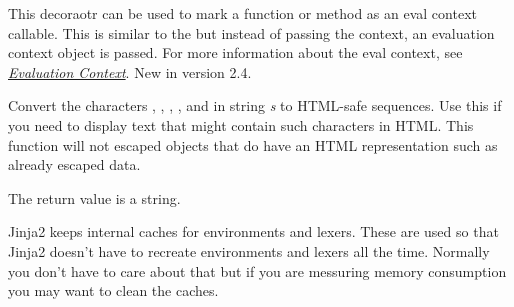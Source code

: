 \documentclass[a4paper,10pt,english]{sphinxmanual}
\begin{document}

\begin{fulllineitems}
\label{api:jinja2.evalcontextfunction}
This decoraotr can be used to mark a function or method as an eval
context callable.  This is similar to the {\hyperref[api:jinja2.contextfunction]{}}
but instead of passing the context, an evaluation context object is
passed.  For more information about the eval context, see
{\hyperref[api:eval-context]{\emph{Evaluation Context}}}.
New in version 2.4.
\end{fulllineitems}


\begin{fulllineitems}
\label{api:jinja2.escape}
Convert the characters \code{\&}, \code{\textless{}}, \code{\textgreater{}}, , and  in string \emph{s}
to HTML-safe sequences.  Use this if you need to display text that might
contain such characters in HTML.  This function will not escaped objects
that do have an HTML representation such as already escaped data.

The return value is a {\hyperref[api:jinja2.Markup]{}} string.

\end{fulllineitems}


\begin{fulllineitems}
\label{api:jinja2.clear_caches}
Jinja2 keeps internal caches for environments and lexers.  These are
used so that Jinja2 doesn't have to recreate environments and lexers all
the time.  Normally you don't have to care about that but if you are
messuring memory consumption you may want to clean the caches.

\end{fulllineitems}

\end{document}
